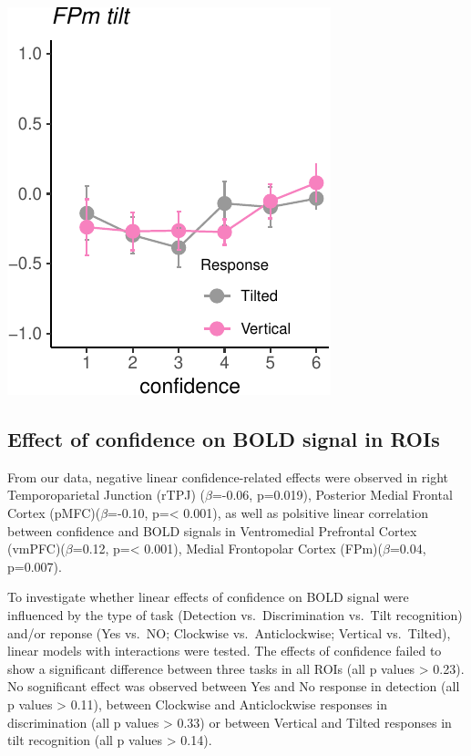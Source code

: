 \documentclass[]{article}
\begin{document}
\includegraphics{Chudi-Thesis_files/figure-latex/unnamed-chunk-11-3.pdf}

\hypertarget{effect-of-confidence-on-bold-signal-in-rois}{%
\subsection{Effect of confidence on BOLD signal in
ROIs}\label{effect-of-confidence-on-bold-signal-in-rois}}

From our data, negative linear confidence-related effects were observed
in right Temporoparietal Junction (rTPJ) (\(\beta\)=-0.06, p=0.019),
Posterior Medial Frontal Cortex (pMFC)(\(\beta\)=-0.10, p=\textless{}
0.001), as well as polsitive linear correlation between confidence and
BOLD signals in Ventromedial Prefrontal Cortex (vmPFC)(\(\beta\)=0.12,
p=\textless{} 0.001), Medial Frontopolar Cortex (FPm)(\(\beta\)=0.04,
p=0.007).

To investigate whether linear effects of confidence on BOLD signal were
influenced by the type of task (Detection vs.~Discrimination vs.~Tilt
recognition) and/or reponse (Yes vs.~NO; Clockwise vs.~Anticlockwise;
Vertical vs.~Tilted), linear models with interactions were tested. The
effects of confidence failed to show a significant difference between
three tasks in all ROIs (all p values \textgreater{} 0.23). No
sognificant effect was observed between Yes and No response in detection
(all p values \textgreater{} 0.11), between Clockwise and Anticlockwise
responses in discrimination (all p values \textgreater{} 0.33) or
between Vertical and Tilted responses in tilt recognition (all p values
\textgreater{} 0.14).
\end{document}
